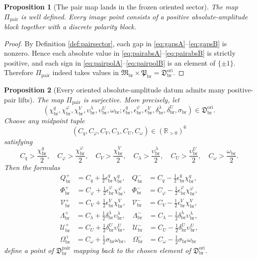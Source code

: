 \documentclass[11pt]{article}
\newcommand{\OriginSector}{\mathfrak D_{\mathrm{br}}^{\mathrm{ori}}}
\newcommand{\AbsAmpSector}{\mathfrak M_{\mathrm{br}}}
\newcommand{\PolaritySector}{\mathfrak P_{\mathrm{br}}}
\newcommand{\AbsReadAmp}{\chi_{\mathrm{br}}^{q}}
\newcommand{\AbsCovAmp}{\chi_{\mathrm{br}}^{\varphi}}
\newcommand{\AbsRelaxAmp}{\chi_{\mathrm{br}}^{V}}
\newcommand{\AbsWellAmp}{\upsilon_{\mathrm{br}}^{\lambda}}
\newcommand{\AbsEqAmp}{\upsilon_{\mathrm{br}}^{U}}
\newcommand{\AbsScaleAmp}{\omega_{\mathrm{br}}}
\newcommand{\PolRead}{\epsilon_{\mathrm{br}}^{q}}
\newcommand{\PolCov}{\epsilon_{\mathrm{br}}^{\varphi}}
\newcommand{\PolRelax}{\epsilon_{\mathrm{br}}^{V}}
\newcommand{\PolWell}{\delta_{\mathrm{br}}^{\lambda}}
\newcommand{\PolEq}{\delta_{\mathrm{br}}^{U}}
\newcommand{\PolScale}{\sigma_{\mathrm{br}}}
\newcommand{\PairSector}{\mathfrak D_{\mathrm{br}}^{\mathrm{pair}}}
\newcommand{\PairMap}{\Pi_{\mathrm{pair}}}
\newcommand{\PairReadPlus}{Q_{\mathrm{br}}^{+}}
\newcommand{\PairReadMinus}{Q_{\mathrm{br}}^{-}}
\newcommand{\PairCovPlus}{\Phi_{\mathrm{br}}^{+}}
\newcommand{\PairCovMinus}{\Phi_{\mathrm{br}}^{-}}
\newcommand{\PairRelaxPlus}{\mathcal V_{\mathrm{br}}^{+}}
\newcommand{\PairRelaxMinus}{\mathcal V_{\mathrm{br}}^{-}}
\newcommand{\PairWellPlus}{\Lambda_{\mathrm{br}}^{+}}
\newcommand{\PairWellMinus}{\Lambda_{\mathrm{br}}^{-}}
\newcommand{\PairEqPlus}{\mathcal U_{\mathrm{br}}^{+}}
\newcommand{\PairEqMinus}{\mathcal U_{\mathrm{br}}^{-}}
\newcommand{\PairScalePlus}{\Omega_{\mathrm{br}}^{+}}
\newcommand{\PairScaleMinus}{\Omega_{\mathrm{br}}^{-}}
\newtheorem{proposition}{Proposition}
\begin{document}
\begin{proposition}[The pair map lands in the frozen oriented sector]
\label{prop:lands}
The map \(\PairMap\) is well defined. Every image point consists of a positive absolute-amplitude block together with a discrete polarity block.
\end{proposition}

\begin{proof}
By Definition \ref{def:pairsector}, each gap in \eqref{eq:gapsA}--\eqref{eq:gapsB} is nonzero. Hence each absolute value in \eqref{eq:pairabsA}--\eqref{eq:pairabsB} is strictly positive, and each sign in \eqref{eq:pairpolA}--\eqref{eq:pairpolB} is an element of \(\{\pm1\}\). Therefore \(\PairMap\) indeed takes values in \(\AbsAmpSector\times\PolaritySector=\OriginSector\).
\end{proof}

\begin{proposition}[Every oriented absolute-amplitude datum admits many positive-pair lifts]
\label{prop:surjective}
The map \(\PairMap\) is surjective. More precisely, let
\[
(\AbsReadAmp,\AbsCovAmp,\AbsRelaxAmp,\AbsWellAmp,\AbsEqAmp,\AbsScaleAmp;
\PolRead,\PolCov,\PolRelax,\PolWell,\PolEq,\PolScale)\in\OriginSector.
\]
Choose any midpoint tuple
\[
(C_{q},C_{\varphi},C_{V},C_{\lambda},C_{U},C_{\omega})
\in(\mathbb R_{>0})^{6}
\]
satisfying
\[
C_{q}>\frac{\AbsReadAmp}{2},
\quad
C_{\varphi}>\frac{\AbsCovAmp}{2},
\quad
C_{V}>\frac{\AbsRelaxAmp}{2},
\quad
C_{\lambda}>\frac{\AbsWellAmp}{2},
\quad
C_{U}>\frac{\AbsEqAmp}{2},
\quad
C_{\omega}>\frac{\AbsScaleAmp}{2}.
\]
Then the formulas
\begin{align}
\PairReadPlus&=C_{q}+\frac{1}{2}\PolRead\AbsReadAmp,
&
\PairReadMinus&=C_{q}-\frac{1}{2}\PolRead\AbsReadAmp,
\nonumber\\
\PairCovPlus&=C_{\varphi}+\frac{1}{2}\PolCov\AbsCovAmp,
&
\PairCovMinus&=C_{\varphi}-\frac{1}{2}\PolCov\AbsCovAmp,
\nonumber\\
\PairRelaxPlus&=C_{V}+\frac{1}{2}\PolRelax\AbsRelaxAmp,
&
\PairRelaxMinus&=C_{V}-\frac{1}{2}\PolRelax\AbsRelaxAmp,
\label{eq:liftsA}
\end{align}
\begin{align}
\PairWellPlus&=C_{\lambda}+\frac{1}{2}\PolWell\AbsWellAmp,
&
\PairWellMinus&=C_{\lambda}-\frac{1}{2}\PolWell\AbsWellAmp,
\nonumber\\
\PairEqPlus&=C_{U}+\frac{1}{2}\PolEq\AbsEqAmp,
&
\PairEqMinus&=C_{U}-\frac{1}{2}\PolEq\AbsEqAmp,
\nonumber\\
\PairScalePlus&=C_{\omega}+\frac{1}{2}\PolScale\AbsScaleAmp,
&
\PairScaleMinus&=C_{\omega}-\frac{1}{2}\PolScale\AbsScaleAmp
\label{eq:liftsB}
\end{align}
define a point of \(\PairSector\) mapping back to the chosen element of \(\OriginSector\).
\end{proposition}
\end{document}

